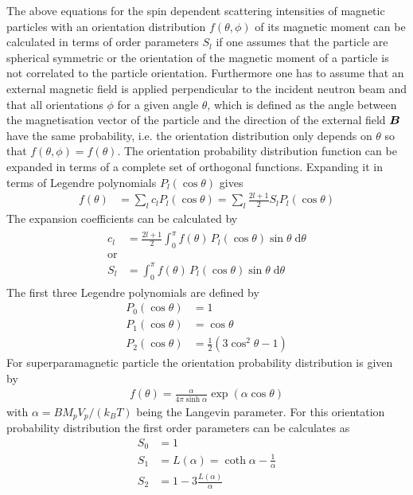 The above equations for the spin dependent scattering intensities of
magnetic particles with an orientation distribution
$f\left(\theta,\phi\right)$ of its magnetic moment can be calculated
in terms of order parameters $S_l$ if one assumes that the particle
are spherical symmetric or the orientation of the magnetic moment of
a particle is not correlated to the particle orientation.
Furthermore one has to assume that an external magnetic field is
applied perpendicular to the incident neutron beam and that all
orientations $\phi$ for a given angle $\theta$, which is defined as
the angle between the magnetisation vector of the particle and the
direction of the external field $\BM{B}$ have the same probability,
i.e. the orientation distribution only depends on $\theta$ so that
$f\left(\theta,\phi\right)=f\left(\theta\right)$. The orientation
probability distribution function can be expanded in terms of a
complete set of orthogonal functions. Expanding it in terms of
Legendre polynomials $P_l(\cos\theta)$ gives
\begin{align}
f(\theta) &= \sum_l c_l P_l(\cos\theta) = \sum_l \frac{2l+1}{2} S_l
P_l(\cos\theta)
\end{align}
The expansion coefficients can be calculated by
\begin{align}
\begin{split}
c_l &= \frac{2l+1}{2} \int_0^\pi f(\theta)\, P_l(\cos\theta) \sin\theta \;\mathrm{d}\theta\\
\mbox{or} \\
S_l &= \int_0^\pi f(\theta) \, P_l(\cos\theta)
\sin\theta\;\mathrm{d}\theta
\end{split}
\end{align}
The first three Legendre polynomials are defined by
\begin{subequations}
\begin{align}
P_0(\cos\theta) &= 1\\
P_1(\cos\theta) &= \cos\theta\ \\
P_2(\cos\theta) &= \frac{1}{2}\left(3\cos^2\theta-1\right)
\end{align}
\end{subequations}
For superparamagnetic particle the orientation probability
distribution is given by
\begin{align}
f(\theta) = \frac{\alpha}{4\pi\sinh\alpha} \exp(\alpha\cos\theta)
\end{align}
with $\alpha=BM_pV_p/(k_BT)$ being the Langevin parameter. For this
orientation probability distribution the first order parameters can
be calculates as
\begin{subequations}
\label{eq:S_l_Boltzmann}
\begin{align}
S_0 & = 1 \\
S_1 & = L(\alpha) = \coth\alpha - \frac{1}{\alpha} \\
S_2 & = 1-3\frac{L(\alpha)}{\alpha}
\end{align}
\end{subequations}


